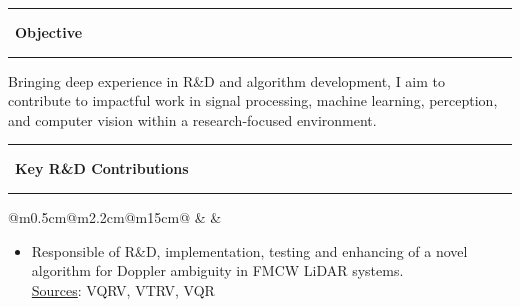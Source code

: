 \documentclass[10pt,a4paper]{article}
\newcommand{\sectionline}[1]{%
  \vspace{0.5em}
  \begin{center}
    \textcolor{title_color}{\rule[0.5ex]{0.25\linewidth}{0.5pt}}
    ~{\LARGE \bfseries \textcolor{title_color}{\cambria #1}}~
    \textcolor{title_color}{\rule[0.5ex]{0.25\linewidth}{0.5pt}}
  \end{center}
  \vspace{0.05em}
}
\begin{document}
\sectionline{Objective}
\textcolor{blocktext1_color}{Bringing deep experience in R\&D and algorithm development, I aim to contribute to impactful work in signal processing, machine learning, perception, and computer vision within a research-focused environment.}

\sectionline{Key R\&D Contributions}

\begin{tabular}{@{}m{0.5cm}@{\hspace{0.5em}}m{2.2cm}@{\hspace{0.5em}}m{15cm}@{}}
   & 
  \raisebox{1.8em}{\begin{minipage}[t]{\linewidth}
  \centering
    \textcolor{blocktitle1_color}{Sep. 21}\\
    \textcolor{blocktitle1_color}{Present}
  \end{minipage} 
  } &
\end{tabular}

\vspace{-1em}
\begin{itemize}[leftmargin=*]
  \item Responsible of R\&D, implementation, testing and enhancing of a novel algorithm for Doppler ambiguity in FMCW LiDAR systems.
  \\ {\fontsize{10pt}{10pt}\selectfont\textcolor{blocktext2_color}{{\fontsize{10pt}{10pt}\selectfont\textcolor{blocktext2_color}{\href{https://amr-aboughazala.super.site/doppler-ambiguity-solution}{Sources}}}: VQRV, VTRV, VQR}}
\end{itemize}
\end{document}
